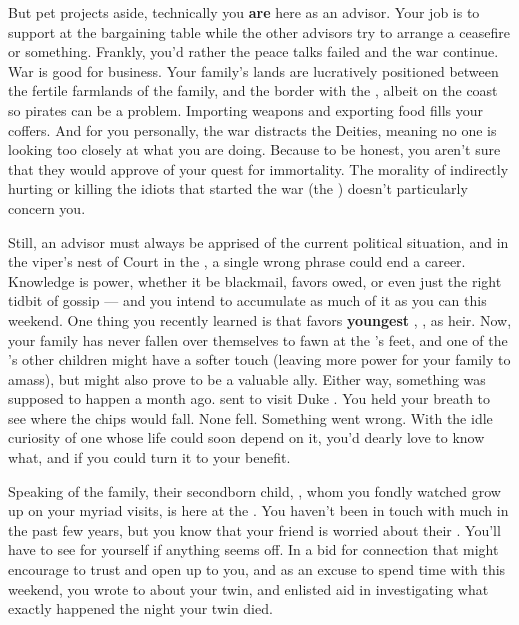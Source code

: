 \documentclass[char]{GL2020}
\begin{document}
But pet projects aside, technically you \textbf{are} here as an advisor. Your job is to support \cEvil{} at the bargaining table while the other advisors try to arrange a ceasefire or something. Frankly, you’d rather the peace talks failed and the war continue. War is good for business. Your family’s lands are lucratively positioned between the fertile farmlands of the \cChupStudent{\formal} family, and the border with the \pTech{}, albeit on the coast so pirates can be a problem. Importing weapons and exporting food fills your coffers. And for you personally, the war distracts the Deities, meaning no one is looking too closely at what you are doing. Because to be honest, you aren’t sure that they would approve of your quest for immortality. The morality of indirectly hurting or killing the idiots that started the war (the \pShip{}) doesn’t particularly concern you.

Still, an advisor must always be apprised of the current political situation, and in the viper's nest of Court in the \pFarm{}, a single wrong phrase could end a career. Knowledge is power, whether it be blackmail, favors owed, or even just the right tidbit of gossip — and you intend to accumulate as much of it as you can this weekend. One thing you recently learned is that \cQueen{\Monarch} \cQueen{} favors \cQueen{\their} \textbf{youngest} \cPrince{\offspring}, \cPrince{\intro}, as \cQueen{\their} heir. Now, your family has never fallen over themselves to fawn at the \cQueen{\Monarch}’s feet, and one of the \cQueen{\Monarch}’s other children might have a softer touch (leaving more power for your family to amass), but \cPrince{} might also prove to be a valuable ally. Either way, something was supposed to happen a month ago. \cQueen{\Monarch} \cQueen{} sent \cPrince{} to visit Duke \cChupStudent{\formal}. You held your breath to see where the chips would fall. None fell. Something went wrong. With the idle curiosity of one whose life could soon depend on it, you’d dearly love to know what, and if you could turn it to your benefit.

Speaking of the \cChupStudent{\formal} family, their secondborn child, \cChupStudent{}, whom you fondly watched grow up on your myriad visits, is here at the \pSchool{}. You haven’t been in touch with \cChupStudent{\them} much in the past few years, but you know that your friend is worried about their \cChupStudent{\offspring}. You’ll have to see for yourself if anything seems off. In a bid for connection that might encourage \cChupStudent{} to trust and open up to you, and as an excuse to spend time with \cChupStudent{\them} this weekend, you wrote to \cChupStudent{\them} about your twin, and enlisted \cChupStudent{\their} aid in investigating what exactly happened the night your twin died. 
\end{document}
